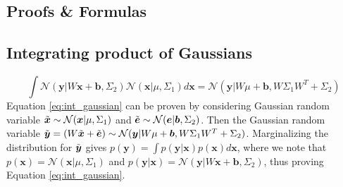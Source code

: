 \documentclass{article}
\begin{document}
\newpage
\printbibliography
\newpage
\begin{appendices}
    \section{Proofs \& Formulas}
    \subsection{Integrating product of Gaussians}
    \begin{equation}
        \int\mathcal{N}(\boldsymbol{y}|W\boldsymbol{x}+\boldsymbol{b},\Sigma_2)\mathcal{N}(\boldsymbol{x}|\mu,\Sigma_1)d\boldsymbol{x}=\mathcal{N}(\boldsymbol{y}|W\mu+\boldsymbol{b},W\Sigma_1W^T+\Sigma_2)
        \label{eq:int_gaussian}
    \end{equation}
    Equation \ref{eq:int_gaussian} can be proven by considering Gaussian random variable $\Tilde{\boldsymbol{x}}\sim\mathcal{N}(\boldsymbol{x}|\mu,\Sigma_1)$ and $\Tilde{\boldsymbol{e}}\sim\mathcal{N}(\boldsymbol{e}|\boldsymbol{b},\Sigma_2)$. Then the Gaussian random variable $\Tilde{\boldsymbol{y}}=(W\Tilde{\boldsymbol{x}}+\Tilde{\boldsymbol{e}})\sim\mathcal{N}(\boldsymbol{y}|W\mu+\boldsymbol{b},W\Sigma_1W^T+\Sigma_2)$. Marginalizing the distribution for $\Tilde{\boldsymbol{y}}$ gives $p(\boldsymbol{y})=\int p(\boldsymbol{y}|\boldsymbol{x})p(\boldsymbol{x})d\boldsymbol{x}$, where we note that $p(\boldsymbol{x})=\mathcal{N}(\boldsymbol{x}|\mu,\Sigma_1)$ and $p(\boldsymbol{y}|\boldsymbol{x})=\mathcal{N}(\boldsymbol{y}|W\boldsymbol{x}+\boldsymbol{b},\Sigma_2)$, thus proving Equation \ref{eq:int_gaussian}.


\end{appendices}
\end{document}

